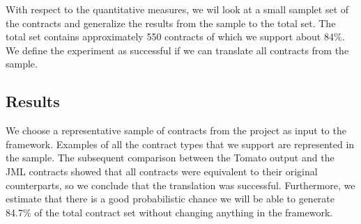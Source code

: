 With respect to the quantitative measures, we wil look at a small samplet set of the contracts and generalize the results from the sample to the total set. The total set contains approximately 550 contracts of which we support about 84\%. We define the experiment as successful if we can translate all contracts from the sample.

\subsection{Results}

We choose a representative sample of contracts from the project as input to the framework. Examples of all the contract types that we support are represented in the sample. The subsequent comparison between the Tomato output and the JML contracts showed that all contracts were equivalent to their original counterparts, so we conclude that the translation was successful. Furthermore, we estimate that there is a good probabilistic chance we will be able to generate 84.7\% of the total contract set without changing anything in the framework.





